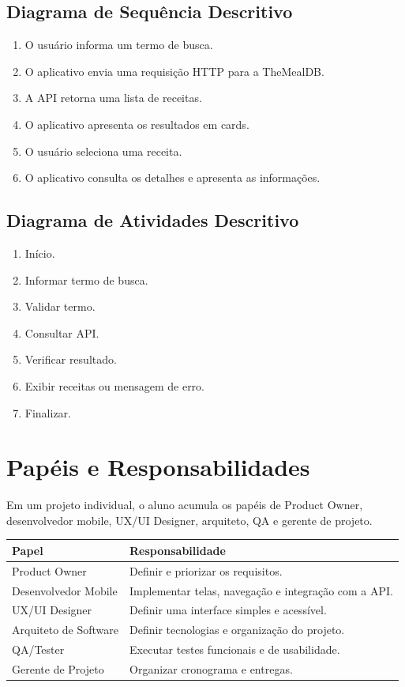 \documentclass[12pt,a4paper]{article}
\begin{document}
\subsection{Diagrama de Sequência Descritivo}

\begin{enumerate}
\item O usuário informa um termo de busca.
\item O aplicativo envia uma requisição HTTP para a TheMealDB.
\item A API retorna uma lista de receitas.
\item O aplicativo apresenta os resultados em cards.
\item O usuário seleciona uma receita.
\item O aplicativo consulta os detalhes e apresenta as informações.
\end{enumerate}

\subsection{Diagrama de Atividades Descritivo}

\begin{enumerate}
\item Início.
\item Informar termo de busca.
\item Validar termo.
\item Consultar API.
\item Verificar resultado.
\item Exibir receitas ou mensagem de erro.
\item Finalizar.
\end{enumerate}

\section{Papéis e Responsabilidades}

Em um projeto individual, o aluno acumula os papéis de Product Owner, desenvolvedor mobile, UX/UI Designer, arquiteto, QA e gerente de projeto.

\begin{longtable}{p{4cm}p{8cm}}
\toprule
Papel & Responsabilidade\\
\midrule
Product Owner & Definir e priorizar os requisitos.\\
Desenvolvedor Mobile & Implementar telas, navegação e integração com a API.\\
UX/UI Designer & Definir uma interface simples e acessível.\\
Arquiteto de Software & Definir tecnologias e organização do projeto.\\
QA/Tester & Executar testes funcionais e de usabilidade.\\
Gerente de Projeto & Organizar cronograma e entregas.\\
\bottomrule
\end{longtable}
\end{document}
